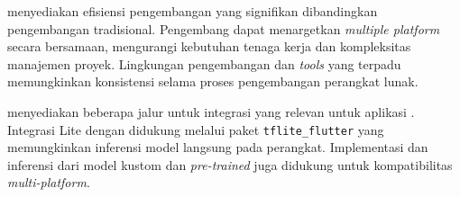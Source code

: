 
\flutter{} menyediakan efisiensi pengembangan yang signifikan dibandingkan pengembangan tradisional. Pengembang dapat menargetkan \emph{multiple platform} secara bersamaan, mengurangi kebutuhan tenaga kerja dan kompleksitas manajemen proyek. Lingkungan pengembangan dan \emph{tools} yang terpadu memungkinkan konsistensi selama proses pengembangan perangkat lunak.



\flutter{} menyediakan beberapa jalur untuk integrasi \ml{} yang relevan untuk aplikasi \cv{}. Integrasi \tensorflow Lite dengan \flutter{} didukung melalui paket \texttt{tflite\_flutter} yang memungkinkan inferensi model langsung pada perangkat. Implementasi dan inferensi dari model kustom dan \emph{pre-trained} juga didukung untuk kompatibilitas \emph{multi-platform}.


